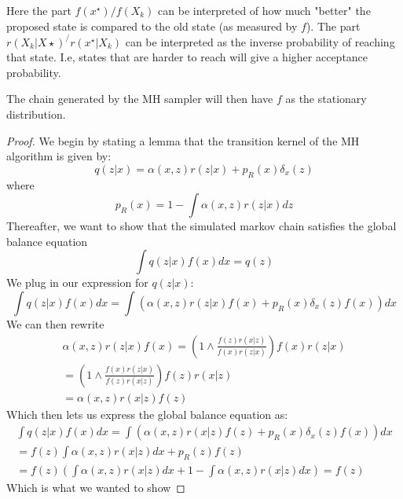 \documentclass[a4paper]{article}
\begin{document}
Here the part $f(x^\star)/f(X_k)$ can be interpreted of how much "better" the proposed state is compared to the old state (as measured by $f$). The part $r(X_k|X\star)^/r(x^\star|X_k)$ can be interpreted as the inverse probability of reaching that state. I.e, states that are harder to reach will give a higher acceptance probability.

The chain generated by the MH sampler will then have $f$ as the stationary distribution.
\begin{proof}
    We begin by stating a lemma that the transition kernel of the MH algorithm is given by:
    \begin{equation}
        q(z|x) = \alpha(x,z)r(z|x) + p_R(x)\delta_x(z)
    \end{equation}
    where
    \begin{equation}
        p_R(x) = 1 - \int\alpha(x,z)r(z|x)dz
    \end{equation}
    Thereafter, we want to show that the simulated markov chain satisfies the global balance equation
    \begin{equation}
        \int q(z|x)f(x)dx = q(z)
    \end{equation}
    We plug in our expression for $q(z|x)$:
    \begin{equation}
        \int q(z|x)f(x)dx = \int\left(\alpha(x,z)r(z|x)f(x) + p_R(x)\delta_x(z)f(x)\right)dx
    \end{equation}
    We can then rewrite
    \begin{equation}
        \begin{gathered}
            \alpha(x,z)r(z|x)f(x) = \left(1 \wedge \frac{f(z)r(x|z)}{f(x)r(z|x)}\right)f(x)r(z|x) \\
            = \left(1 \wedge \frac{f(x)r(z|x)}{f(z)r(x|z)}\right)f(z)r(x|z) \\
            = \alpha(x,z)r(x|z)f(z)
        \end{gathered}
    \end{equation}
    Which then lets us express the global balance equation as:
    \begin{equation}
        \begin{gathered}
            \int q(z|x)f(x)dx = \int\left(\alpha(x,z)r(x|z)f(z) + p_R(x)\delta_x(z)f(x)\right)dx \\ 
            = f(z)\int\alpha(x,z)r(x|z)dx + p_R(z)f(z) \\
            = f(z)\left(\int\alpha(x,z)r(x|z)dx + 1 - \int\alpha(x,z)r(x|z)dx\right) = f(z)
        \end{gathered}
    \end{equation}
    Which is what we wanted to show
\end{proof}
\end{document}
